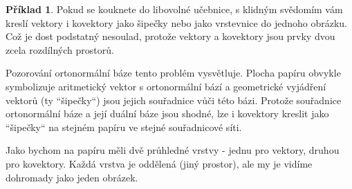 \documentclass[a5paper,12pt]{amsbook}
\theoremstyle{definition}
\newtheorem{example}{Příklad}[chapter]
\begin{document}
\begin{example}
Pokud se kouknete do libovolné učebnice, s klidným svědomím vám kreslí vektory i kovektory
jako šipečky nebo jako vrstevnice do jednoho obrázku. Což je dost podstatný nesoulad,
protože vektory a kovektory jsou prvky dvou zcela rozdílných prostorů.

Pozorování ortonormální báze tento problém vysvětluje. Plocha papíru obvykle symbolizuje
aritmetický vektor s ortonormální bází a geometrické vyjádření vektorů (ty ``šipečky``)
jsou jejich souřadnice vůči této bázi. Protože souřadnice ortonormální báze a její duální
báze jsou shodné, lze i kovektory kreslit jako ``šipečky`` na stejném papíru ve stejné
souřadnicové síti.

Jako bychom na papíru měli dvě průhledné vrstvy - jednu pro vektory, druhou pro kovektory.
Každá vrstva je oddělená (jiný prostor), ale my je vidíme dohromady jako jeden obrázek.

\end{example}
\end{document}
